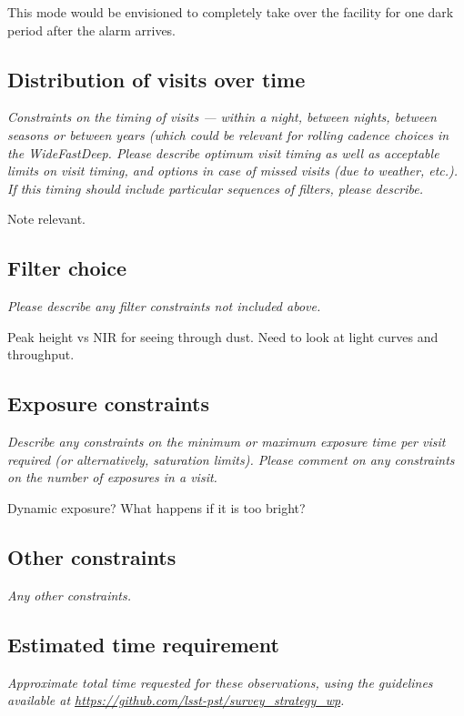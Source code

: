 \documentclass[12pt, letterpaper]{article}
\begin{document}
This mode would be envisioned to completely take over the facility for
one dark period after the alarm arrives.

\subsection{Distribution of visits over time}
\begin{footnotesize}{\it Constraints on the timing of visits --- within a night, between nights, between seasons or
between years (which could be relevant for rolling cadence choices in the WideFastDeep. 
Please describe optimum visit timing as well as acceptable limits on visit timing, and options in
case of missed visits (due to weather, etc.). If this timing should include particular sequences
of filters, please describe.}
\end{footnotesize}

Note relevant.

\subsection{Filter choice}
\begin{footnotesize}
{\it Please describe any filter constraints not included above.}
\end{footnotesize}

Peak height vs NIR for seeing through dust. Need to look at light
curves and throughput.

\subsection{Exposure constraints}
\begin{footnotesize}
{\it Describe any constraints on the minimum or maximum exposure time per visit required (or alternatively, saturation limits).
Please comment on any constraints on the number of exposures in a visit.}
\end{footnotesize}

Dynamic exposure? What happens if it is too bright?


\subsection{Other constraints}
\begin{footnotesize}
{\it Any other constraints.}
\end{footnotesize}

\subsection{Estimated time requirement}
\begin{footnotesize}
{\it Approximate total time requested for these observations, using the guidelines available at \url{https://github.com/lsst-pst/survey_strategy_wp}.}
\end{footnotesize}
\end{document}

